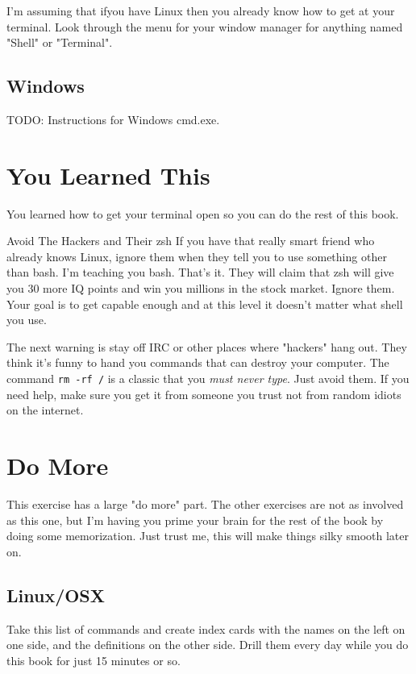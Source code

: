 I'm assuming that ifyou have Linux then you already know how to get at your terminal.  Look through the
menu for your window manager for anything named "Shell" or "Terminal".

\subsection{Windows}

TODO: Instructions for Windows cmd.exe.


\section{You Learned This}

You learned how to get your terminal open so you can do the rest of this book.

\begin{aside}{Avoid The Hackers and Their zsh}
If you have that really smart friend who already knows Linux, ignore them when they tell you to use something
other than bash.  I'm teaching you bash.  That's it.  They will claim that zsh will give you 30 more IQ points
and win you millions in the stock market.  Ignore them.  Your goal is to get capable enough and at this level
it doesn't matter what shell you use.

The next warning is stay off IRC or other places where "hackers" hang out.  They think it's funny to hand you
commands that can destroy your computer.  The command \verb|rm -rf /| is a classic that you \emph{must never type}.
Just avoid them.  If you need help, make sure you get it from someone you trust not from random idiots on the
internet.
\end{aside}

\section{Do More}

This exercise has a large "do more" part.  The other exercises are not as involved as this one, but
I'm having you prime your brain for the rest of the book by doing some memorization.  Just trust me,
this will make things silky smooth later on.

\subsection{Linux/OSX}

Take this list of commands and create index cards with the names on the left
on one side, and the definitions on the other side.  Drill them every day while
you do this book for just 15 minutes or so.

